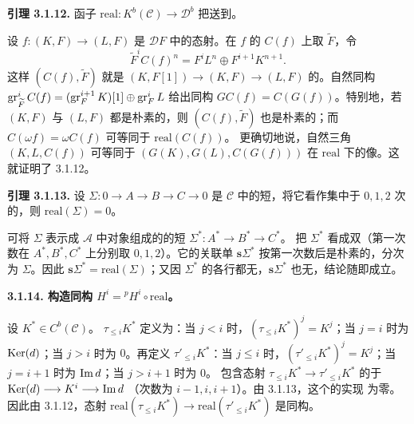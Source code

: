 \par\medskip\noindent\textbf{引理 3.1.12.}
函子 $\mathrm{real}:K^b(\mathcal C)\longrightarrow\mathcal D^b$ 把送到。

设 $f:(K,F)\longrightarrow(L,F)$ 是 $\mathcal D F$ 中的态射。在 $f$ 的 $C(f)$ 上取 $\widetilde F$，令
\[
\widetilde F^iC(f)^n=F^iL^n\oplus F^{i+1}K^{n+1}.
\]
这样 $(C(f),\widetilde F)$ 就是
$(K,F[1])\longrightarrow(K,F)\longrightarrow(L,F)$ 的。自然同构
$\operatorname{gr}_{\widetilde F}^iC(f)=(\operatorname{gr}_F^{i+1}K)[1]\oplus\operatorname{gr}_F^iL$
给出同构 $GC(f)=C(G(f))$。特别地，若 $(K,F)$ 与 $(L,F)$ 都是朴素的，则 $(C(f),\widetilde F)$ 也是朴素的；而
$C(\omega f)=\omega C(f)$ 可等同于 $\mathrm{real}(C(f))$。
更确切地说，自然三角 $(K,L,C(f))$ 可等同于
$(G(K),G(L),C(G(f)))$ 在 $\mathrm{real}$ 下的像。这就证明了 3.1.12。

\par\medskip\noindent\textbf{引理 3.1.13.}
设 $\Sigma:0\longrightarrow A\longrightarrow B\longrightarrow C\longrightarrow0$ 是 $\mathcal C$ 中的短，将它看作集中于 $0,1,2$ 次的，则 $\mathrm{real}(\Sigma)=0$。

可将 $\Sigma$ 表示成 $\mathcal A$ 中对象组成的的短
$\Sigma^*:A^*\longrightarrow B^*\longrightarrow C^*$。
把 $\Sigma^*$ 看成双（第一次数在 $A^*,B^*,C^*$ 上分别取 $0,1,2$）。它的关联单 $\mathbf s\Sigma^*$ 按第一次数后是朴素的，分次为 $\Sigma$。因此
$\mathbf s\Sigma^*=\mathrm{real}(\Sigma)$；又因 $\Sigma^*$ 的各行都无，$\mathbf s\Sigma^*$ 也无，结论随即成立。

\par\medskip\noindent\textbf{3.1.14. 构造同构 $H^i={}^pH^i\circ\mathrm{real}$。}

设 $K^*\in C^b(\mathcal C)$。 $\tau_{\leq i}K^*$ 定义为：当 $j<i$ 时，$(\tau_{\leq i}K^*)^j=K^j$；当 $j=i$ 时为 $\operatorname{Ker}(d)$；当 $j>i$ 时为 $0$。再定义 $\tau'_{\leq i}K^*$：当 $j\leq i$ 时，$(\tau'_{\leq i}K^*)^j=K^j$；当 $j=i+1$ 时为 $\operatorname{Im} d$；当 $j>i+1$ 时为 $0$。
包含态射 $\tau_{\leq i}K^*\longrightarrow\tau'_{\leq i}K^*$ 的于
$\operatorname{Ker}(d)\longrightarrow K^i\longrightarrow\operatorname{Im} d$
（次数为 $i-1,i,i+1$）。由 3.1.13，这个的实现
为零。因此由 3.1.12，态射
$\mathrm{real}(\tau_{\leq i}K^*)\longrightarrow\mathrm{real}(\tau'_{\leq i}K^*)$
是同构。

